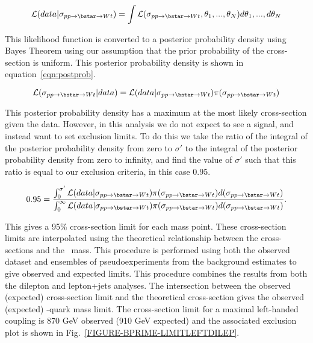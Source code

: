 \begin{equation}
  {\cal L}(data|\sigma_{pp\to \bstar \to Wt}) = \int  {\cal L}(\sigma_{pp\to \bstar \to Wt},\theta_1, ..., \theta_N)d\theta_1, ..., d\theta_N 
\label{eqn:lhoodn}
\end{equation}

\noindent
This likelihood function is converted to a posterior probability density using Bayes Theorem using our assumption that the prior probability of the cross-section is uniform. This posterior probability density is shown in equation~\ref{eqn:postprob}.

\begin{equation}
{\cal L}(\sigma_{pp\to \bstar \to Wt}|data) = {\cal L}(data|\sigma_{pp\to \bstar \to Wt})\pi(\sigma_{pp\to \bstar \to Wt}) 
\label{eqn:postprob}
\end{equation}

\noindent
 This posterior probability density has a maximum at the most likely cross-section given the data. However, in this analysis we do not expect to see a signal, and instead want to set exclusion limits. To do this we take the ratio of the integral of the posterior probability density from zero to $\sigma'$ to the integral of the posterior probability density from zero to infinity, and find the value of $\sigma'$ such that this ratio is equal to our exclusion criteria, in this case 0.95.

\begin{equation}
0.95 = \frac{\int_{0}^{\sigma'}
{\cal L}(data|\sigma_{pp\to \bstar\to Wt})\pi(\sigma_{pp\to \bstar\to Wt}) d(\sigma_{pp\to \bstar\to Wt})} {\int_0^\infty
{\cal L}(data|\sigma_{pp\to \bstar\to Wt})\pi(\sigma_{pp\to \bstar\to Wt}) d(\sigma_{pp\to \bstar\to Wt})}.
\end{equation}

\noindent
This gives a 95\% cross-section limit for each mass point. These cross-section limits are interpolated using the theoretical relationship between the cross-sections and the \bstar\ mass. This procedure is performed using both the observed dataset and ensembles of pseudoexperiments from the background estimates to give observed and expected limits. This procedure combines the results from both the dilepton and lepton+jets analyses. The intersection between the observed (expected) cross-section limit and the theoretical cross-section gives the observed (expected) \bstar-quark mass limit. The cross-section limit for a maximal left-handed coupling is 870 GeV observed (910 GeV expected) and the associated exclusion plot is shown in Fig.~\ref{FIGURE-BPRIME-LIMITLEFTDILEP}.

